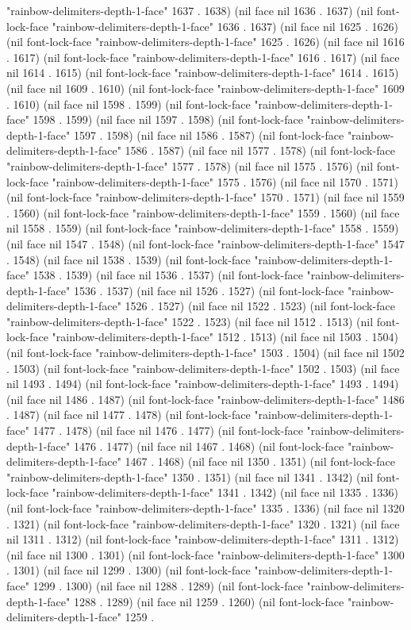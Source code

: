 "rainbow-delimiters-depth-1-face" 1637 . 1638) (nil face nil 1636 . 1637) (nil font-lock-face "rainbow-delimiters-depth-1-face" 1636 . 1637) (nil face nil 1625 . 1626) (nil font-lock-face "rainbow-delimiters-depth-1-face" 1625 . 1626) (nil face nil 1616 . 1617) (nil font-lock-face "rainbow-delimiters-depth-1-face" 1616 . 1617) (nil face nil 1614 . 1615) (nil font-lock-face "rainbow-delimiters-depth-1-face" 1614 . 1615) (nil face nil 1609 . 1610) (nil font-lock-face "rainbow-delimiters-depth-1-face" 1609 . 1610) (nil face nil 1598 . 1599) (nil font-lock-face "rainbow-delimiters-depth-1-face" 1598 . 1599) (nil face nil 1597 . 1598) (nil font-lock-face "rainbow-delimiters-depth-1-face" 1597 . 1598) (nil face nil 1586 . 1587) (nil font-lock-face "rainbow-delimiters-depth-1-face" 1586 . 1587) (nil face nil 1577 . 1578) (nil font-lock-face "rainbow-delimiters-depth-1-face" 1577 . 1578) (nil face nil 1575 . 1576) (nil font-lock-face "rainbow-delimiters-depth-1-face" 1575 . 1576) (nil face nil 1570 . 1571) (nil font-lock-face "rainbow-delimiters-depth-1-face" 1570 . 1571) (nil face nil 1559 . 1560) (nil font-lock-face "rainbow-delimiters-depth-1-face" 1559 . 1560) (nil face nil 1558 . 1559) (nil font-lock-face "rainbow-delimiters-depth-1-face" 1558 . 1559) (nil face nil 1547 . 1548) (nil font-lock-face "rainbow-delimiters-depth-1-face" 1547 . 1548) (nil face nil 1538 . 1539) (nil font-lock-face "rainbow-delimiters-depth-1-face" 1538 . 1539) (nil face nil 1536 . 1537) (nil font-lock-face "rainbow-delimiters-depth-1-face" 1536 . 1537) (nil face nil 1526 . 1527) (nil font-lock-face "rainbow-delimiters-depth-1-face" 1526 . 1527) (nil face nil 1522 . 1523) (nil font-lock-face "rainbow-delimiters-depth-1-face" 1522 . 1523) (nil face nil 1512 . 1513) (nil font-lock-face "rainbow-delimiters-depth-1-face" 1512 . 1513) (nil face nil 1503 . 1504) (nil font-lock-face "rainbow-delimiters-depth-1-face" 1503 . 1504) (nil face nil 1502 . 1503) (nil font-lock-face "rainbow-delimiters-depth-1-face" 1502 . 1503) (nil face nil 1493 . 1494) (nil font-lock-face "rainbow-delimiters-depth-1-face" 1493 . 1494) (nil face nil 1486 . 1487) (nil font-lock-face "rainbow-delimiters-depth-1-face" 1486 . 1487) (nil face nil 1477 . 1478) (nil font-lock-face "rainbow-delimiters-depth-1-face" 1477 . 1478) (nil face nil 1476 . 1477) (nil font-lock-face "rainbow-delimiters-depth-1-face" 1476 . 1477) (nil face nil 1467 . 1468) (nil font-lock-face "rainbow-delimiters-depth-1-face" 1467 . 1468) (nil face nil 1350 . 1351) (nil font-lock-face "rainbow-delimiters-depth-1-face" 1350 . 1351) (nil face nil 1341 . 1342) (nil font-lock-face "rainbow-delimiters-depth-1-face" 1341 . 1342) (nil face nil 1335 . 1336) (nil font-lock-face "rainbow-delimiters-depth-1-face" 1335 . 1336) (nil face nil 1320 . 1321) (nil font-lock-face "rainbow-delimiters-depth-1-face" 1320 . 1321) (nil face nil 1311 . 1312) (nil font-lock-face "rainbow-delimiters-depth-1-face" 1311 . 1312) (nil face nil 1300 . 1301) (nil font-lock-face "rainbow-delimiters-depth-1-face" 1300 . 1301) (nil face nil 1299 . 1300) (nil font-lock-face "rainbow-delimiters-depth-1-face" 1299 . 1300) (nil face nil 1288 . 1289) (nil font-lock-face "rainbow-delimiters-depth-1-face" 1288 . 1289) (nil face nil 1259 . 1260) (nil font-lock-face "rainbow-delimiters-depth-1-face" 1259 . 